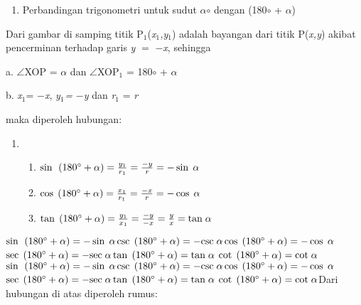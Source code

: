 \documentclass[11pt,fleqn]{book} %
\begin{document}
\begin{myEnumerate}
\begin{itemize}
\noindent 

\noindent 

\begin{enumerate}
\item  Perbandingan trigonometri untuk sudut $\alpha$$\circ$ dengan (180$\circ$ + $\alpha$)
\end{enumerate}

\noindent Dari gambar di samping  titik P${}_{1}$(\textit{x}${}_{1}$\textit{,y}${}_{1}$) adalah bayangan dari titik P(\textit{x,y}) akibat pencerminan terhadap garis \textit{y} $=$ $-$\textit{x}, sehingga 

\noindent a. $\angle$XOP = $\alpha$ dan $\angle$XOP${}_{1}$ = 180$\circ$ + $\alpha$

\noindent b.  \textit{x}${}_{1 }$= $-$\textit{x}, \textit{y}${}_{1}$\textit{${}_{ }$= }$-$\textit{y} dan \textit{r}${}_{1}$ = \textit{r}

maka diperoleh hubungan: 

\begin{enumerate}
\item \begin{enumerate}
\item  $\sin {\rm \; }\left(180{}^\circ +\alpha \right)=\frac{y_{1} }{r_{1} } =\frac{-y}{r} =-\sin {\rm \; }\alpha $

\item  ${\rm cos\; }\left(180{}^\circ +\alpha \right)=\frac{x_{1} }{r_{1} } =\frac{-x}{r} =-\cos {\rm \; }\alpha $

\item  ${\rm tan\; }\left(180{}^\circ +\alpha \right)=\frac{y_{1} }{x_{1} } =\frac{-y}{-x} =\frac{y}{x} ={\rm tan\; }\alpha $
\end{enumerate}
\end{enumerate}

\noindent $\sin {\rm \; }\left(180{}^\circ +\alpha \right)=-\sin {\rm \; }\alpha $${\rm csc\; }\left(180{}^\circ +\alpha \right)=-{\rm csc\; }\alpha $${\rm cos\; }\left(180{}^\circ +\alpha \right)=-\cos {\rm \; }\alpha $${\rm sec\; }\left(180{}^\circ +\alpha \right)=-{\rm sec\; }\alpha $${\rm tan\; }\left(180{}^\circ +\alpha \right)={\rm tan\; }\alpha $ ${\rm cot\; }\left(180{}^\circ +\alpha \right)={\rm cot\; }\alpha $$\sin {\rm \; }\left(180{}^\circ +\alpha \right)=-\sin {\rm \; }\alpha $${\rm csc\; }\left(180{}^\circ +\alpha \right)=-{\rm csc\; }\alpha $${\rm cos\; }\left(180{}^\circ +\alpha \right)=-\cos {\rm \; }\alpha $${\rm sec\; }\left(180{}^\circ +\alpha \right)=-{\rm sec\; }\alpha $${\rm tan\; }\left(180{}^\circ +\alpha \right)={\rm tan\; }\alpha $ ${\rm cot\; }\left(180{}^\circ +\alpha \right)={\rm cot\; }\alpha $Dari hubungan di atas diperoleh rumus:


\end{itemize}
\end{myEnumerate}
\end{document}
